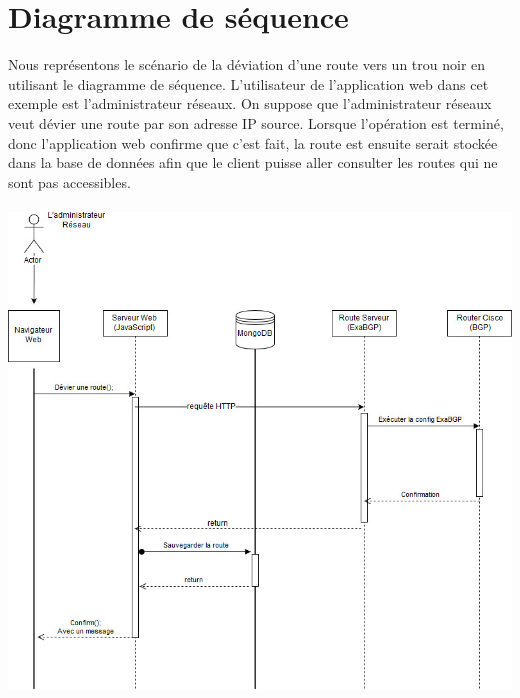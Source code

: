 \section{Diagramme de séquence}

Nous représentons le scénario de la déviation d'une route vers un trou noir en utilisant le diagramme de séquence.
\newline
L'utilisateur de l'application web dans cet exemple est l'administrateur réseaux. On suppose que l'administrateur réseaux veut dévier une route par son adresse IP source. 
\newline
Lorsque l'opération est terminé, donc l'application web confirme que c'est fait, la route est ensuite serait stockée dans la base de données afin que le client puisse aller consulter les routes qui ne sont pas accessibles.
\\
\\

\includegraphics[scale = 0.5]{img/seqDiagramme}

